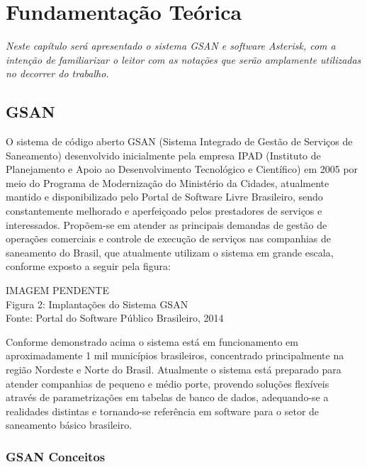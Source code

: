 \chapter[Fundamentação Teórica]{\textbf{F}undamentação \textbf{T}eórica}

\textit{Neste capítulo será apresentado o sistema GSAN e software Asterisk, com a intenção de familiarizar o leitor com as notações que serão amplamente utilizadas no decorrer do trabalho.}


\section{GSAN}
O sistema de código aberto GSAN (Sistema Integrado de Gestão de Serviços de Saneamento) desenvolvido inicialmente pela empresa IPAD (Instituto de Planejamento e Apoio ao Desenvolvimento Tecnológico e Científico) em 2005 por meio do Programa de Modernização do Ministério da Cidades, atualmente mantido e disponibilizado pelo Portal de Software Livre Brasileiro, sendo constantemente melhorado e aperfeiçoado pelos prestadores de serviços e interessados. Propõem-se em atender as principais demandas de gestão de operações comerciais e controle de execução de serviços nas companhias de saneamento do Brasil, que atualmente utilizam o sistema em grande escala, conforme exposto a seguir pela figura:


\begin{center}
	IMAGEM PENDENTE \\
	Figura 2: Implantações do Sistema GSAN \\
	Fonte: Portal do Software Público Brasileiro, 2014 \\
\end{center}
Conforme demonstrado acima o sistema está em funcionamento em aproximadamente 1 mil municípios brasileiros, concentrado principalmente na região Nordeste e Norte do Brasil. Atualmente o sistema está preparado para atender companhias de pequeno e médio porte, provendo soluções flexíveis através de parametrizações em tabelas de banco de dados, adequando-se a realidades distintas e tornando-se referência em software para o setor de saneamento básico brasileiro. 

\subsection{GSAN Conceitos}

